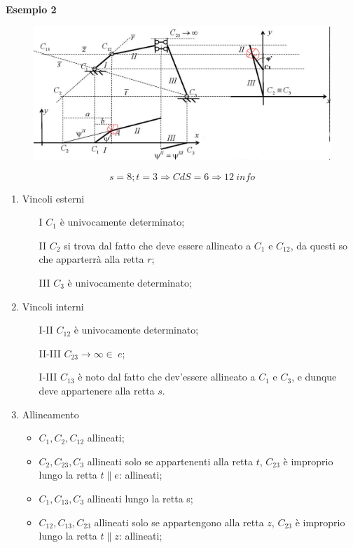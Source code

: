 \documentclass{article}
\begin{document}
\begin{adjustwidth}{2in}{}
\textbf{Esempio 2} \newline
\begin{figure}[H]
	\centering
	\includegraphics[width=0.65\linewidth]{immagini/1.PARTE3_Pagina_20}
\end{figure}


\[ s=8; t=3 \Rightarrow CdS = 6 \Rightarrow 12 ~ info\]

\begin{enumerate}
	\item Vincoli esterni 
	\begin{itemize}
		\item[I] $C_1$ è univocamente determinato;
		\item[II] $C_2$ si trova dal fatto che deve essere allineato a $C_1$ e $C_{12}$, da questi so che apparterrà alla retta $r$;
		\item[III] $C_3$ è univocamente determinato;
	\end{itemize}

	\item Vincoli interni
	\begin{itemize}
		\item[I-II]  $C_{12}$ è univocamente determinato;
		\item[II-III] $C_{23} \rightarrow \infty \in ~  e$;
	 	\item[I-III] $C_{13}$ è noto dal fatto che dev'essere allineato a $C_1$ e $C_3$, e dunque deve appartenere alla retta $s$.
	\end{itemize}
	\item Allineamento
	\begin{itemize}
		\item $C_1, C_2, C_{12}$ allineati;
		\item $C_2, C_{23}, C_3$ allineati solo se appartenenti alla retta $t$, $C_{23}$ è improprio lungo la retta $t \parallel e$: allineati;
		\item $C_1, C_{13}, C_3$ allineati lungo la retta s;
		\item $C_{12}, C_{13}, C_{23}$ allineati solo se appartengono alla retta $z$, $C_{23}$ è improprio lungo la retta $t \parallel z$: allineati;
	\end{itemize}	
\end{enumerate}


\end{adjustwidth}
\end{document}

